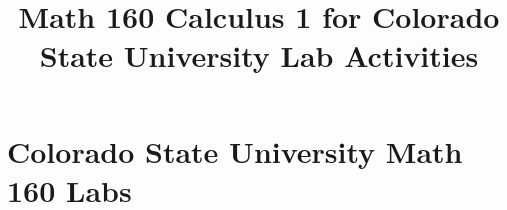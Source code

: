 \documentclass[10pt,handout,twocolumn,twoside,wordchoicegiven]{xourse}
\title{Math 160 Calculus 1 for Colorado State University Lab Activities}
\begin{document}
\maketitle

\setcounter{tocdepth}{2}

\part{Colorado State University Math 160 Labs}











\iftikzexport\else\printindex\fi
\end{document}
